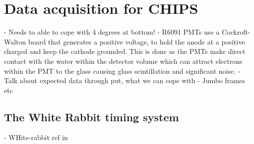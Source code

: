 \chapter{Data acquisition for CHIPS} %
\label{chap:daq} %

- Needs to able to cope with 4 degrees at bottom!
- R6091 PMTs use a Cockroft-Walton board that generates a positive voltage, to hold the anode at a
positive charged and keep the cathode grounded. This is done as the PMTs make direct contact with
the water within the detector volume which can attract electrons within the PMT to the glass
causing glass scintillation and significant noise.
- Talk about expected data through put, what we can cope with
- Jumbo frames etc

\section{The White Rabbit timing system} %
\label{sec:daq_timing} %

- WHite-rabbit ref in~\cite{lipinski2011}

